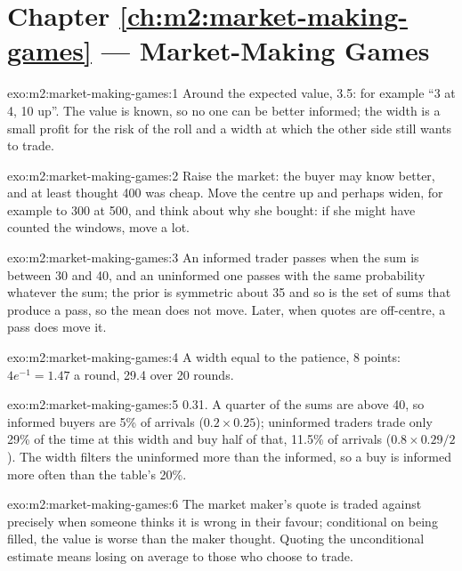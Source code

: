 \section*{Chapter \ref{ch:m2:market-making-games} --- Market-Making Games}

\begin{solution}{exo:m2:market-making-games:1}
Around the expected value, 3.5: for example ``3 at 4, 10 up''. The value is known, so no
one can be better informed; the width is a small profit for the risk of the roll and a
width at which the other side still wants to trade.
\end{solution}

\begin{solution}{exo:m2:market-making-games:2}
Raise the market: the buyer may know better, and at least thought 400 was cheap. Move the
centre up and perhaps widen, for example to 300 at 500, and think about why she bought:
if she might have counted the windows, move a lot.
\end{solution}

\begin{solution}{exo:m2:market-making-games:3}
An informed trader passes when the sum is between 30 and 40, and an uninformed one passes
with the same probability whatever the sum; the prior is symmetric about 35 and so is
the set of sums that produce a pass, so the mean does not move. Later, when quotes are
off-centre, a pass does move it.
\end{solution}

\begin{solution}{exo:m2:market-making-games:4}
A width equal to the patience, 8 points: $4e^{-1} = 1.47$ a round, 29.4 over 20 rounds.
\end{solution}

\begin{solution}{exo:m2:market-making-games:5}
0.31. A quarter of the sums are above 40, so informed buyers are 5\% of arrivals
($0.2 \times 0.25$); uninformed traders trade only 29\% of the time at this width and buy
half of that, 11.5\% of arrivals ($0.8 \times 0.29 / 2$). The width filters the uninformed
more than the informed, so a buy is informed more often than the table's 20\%.
\end{solution}

\begin{solution}{exo:m2:market-making-games:6}
The market maker's quote is traded against precisely when someone thinks it is wrong in
their favour; conditional on being filled, the value is worse than the maker thought.
Quoting the unconditional estimate means losing on average to those who choose to trade.
\end{solution}

